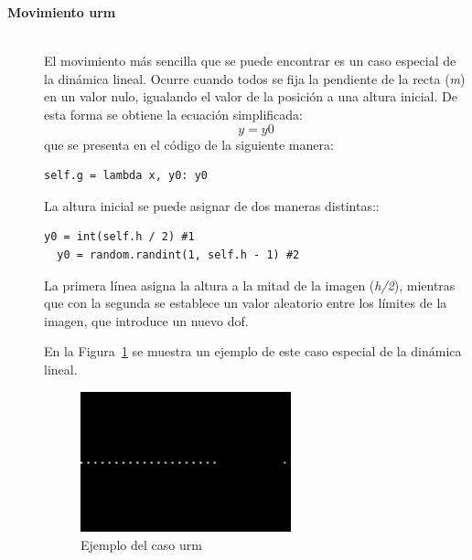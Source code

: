 \begin{description}
\item[\textbf{Movimiento \acrshort{urm}}] \hfill 
\vspace{10pt}
\\
El movimiento más sencilla que se puede encontrar es un caso especial de la dinámica lineal. Ocurre cuando todos se fija la pendiente de la recta (\textit{m}) en un valor nulo, igualando el valor de la posición a una altura inicial. De esta forma se obtiene la ecuación simplificada:
$$y = y0$$
que se presenta en el código de la siguiente manera:
\vspace{10pt}
\begin{lstlisting}[frame=single]
  self.g = lambda x, y0: y0
\end{lstlisting}
La altura inicial se puede asignar de dos maneras distintas::
\vspace{10pt}
\begin{lstlisting}[frame=single]
  y0 = int(self.h / 2) #1
  y0 = random.randint(1, self.h - 1) #2
\end{lstlisting}
La primera línea asigna la altura a la mitad de la imagen (\textit{h/2}), mientras que con la segunda se establece un valor aleatorio entre los límites de la imagen, que introduce un nuevo \acrshort{dof}.

En la Figura~\ref{fig.urm} se muestra un ejemplo de este caso especial de la dinámica lineal.

\begin{figure}[H]
		\begin{center}
			\includegraphics[width=0.6\textwidth]{Memoria-TFM/figures/samples/URM_sample.png}
			\caption{Ejemplo del caso \acrshort{urm}}
			\label{fig.urm}
		\end{center}
\end{figure}
\vspace{-10pt}


\end{description}
